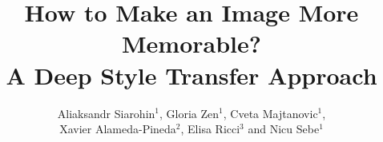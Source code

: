 \documentclass{sig-alternate-05-2015}
\begin{document}

\newcommand\Tstrut{\rule{0pt}{2.7ex}}         %
\newcommand\Bstrut{\rule[-0.9ex]{0pt}{0pt}}   %

\newcommand{\xavi}[1]{\textcolor{red}{\textbf{X:} #1}}
\newcommand{\glo}[1]{\textcolor{blue}{\textbf{G:} #1}}
\newcommand{\eli}[1]{\textcolor{magenta}{\textbf{E:} #1}}






\title{How to Make an Image More Memorable? \\A Deep Style Transfer Approach}



\author{
Aliaksandr Siarohin$^1$, Gloria Zen$^1$, Cveta Majtanovic$^1$,\\ Xavier Alameda-Pineda$^2$, Elisa Ricci$^{3}$ and Nicu Sebe$^1$\\
\\
\\
}
\end{document}
